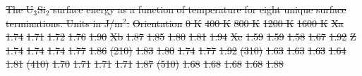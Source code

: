 \documentclass[review]{elsarticle}
\providecommand{\DIFdeltex}[1]{{\protect\color{red}\sout{#1}}}                      %
\providecommand{\DIFdelbegin}{} %
\providecommand{\DIFdelFL}[1]{\DIFdel{#1}} %
\providecommand{\DIFdel}[1]{\texorpdfstring{\DIFdeltex{#1}}{}} %
\newcommand{\DIFscaledelfig}{0.5}
\newlength{\DIFdelgraphicswidth} %
\newlength{\DIFdelgraphicsheight} %
\newcommand{\DIFdelincludegraphics}[2][]{%
\sbox{\DIFdelgraphicsbox}{\DIFOincludegraphics[#1]{#2}}%
\settoboxwidth{\DIFdelgraphicswidth}{\DIFdelgraphicsbox} %
\settoboxtotalheight{\DIFdelgraphicsheight}{\DIFdelgraphicsbox} %
\scalebox{\DIFscaledelfig}{%
\parbox[b]{\DIFdelgraphicswidth}{\usebox{\DIFdelgraphicsbox}\\[-\baselineskip] \rule{\DIFdelgraphicswidth}{0em}}\llap{\resizebox{\DIFdelgraphicswidth}{\DIFdelgraphicsheight}{%
\setlength{\unitlength}{\DIFdelgraphicswidth}%
\begin{picture}(1,1)%
\thicklines\linethickness{2pt} %
{\color[rgb]{1,0,0}\put(0,0){\framebox(1,1){}}}%
{\color[rgb]{1,0,0}\put(0,0){\line( 1,1){1}}}%
{\color[rgb]{1,0,0}\put(0,1){\line(1,-1){1}}}%
\end{picture}%
}\hspace*{3pt}}} %
} %
\DeclareRobustCommand{\DIFdelbegin}{\DIFOdelbegin \let\includegraphics\DIFdelincludegraphics} %
\begin{document}
\DIFdelbegin %
{%
\DIFdelFL{The U$_{3}$Si$_{2}$ surface energy as a function of temperature for eight unique surface terminations. Units in J/m$^{2}$.}} %
\DIFdelFL{Orientation }%
\DIFdelFL{0 K }%
\DIFdelFL{400 K }%
\DIFdelFL{800 K }%
\DIFdelFL{1200 K }%
\DIFdelFL{1600 K}%
\DIFdelFL{Xa }%
\DIFdelFL{1.74	 }%
\DIFdelFL{1.71 }%
\DIFdelFL{1.72 }%
\DIFdelFL{1.76 }%
\DIFdelFL{1.90 }%
\DIFdelFL{Xb }%
\DIFdelFL{1.87 }%
\DIFdelFL{1.85 }%
\DIFdelFL{1.80 }%
\DIFdelFL{1.81 }%
\DIFdelFL{1.94 }%
\DIFdelFL{Xc }%
\DIFdelFL{1.59	 }%
\DIFdelFL{1.59 }%
\DIFdelFL{1.58 }%
\DIFdelFL{1.67 }%
\DIFdelFL{1.92 }%
\DIFdelFL{Z }%
\DIFdelFL{1.74 }%
\DIFdelFL{1.74 }%
\DIFdelFL{1.74 }%
\DIFdelFL{1.77 }%
\DIFdelFL{1.86 }%
\DIFdelFL{(210) }%
\DIFdelFL{1.83 }%
\DIFdelFL{1.80 }%
\DIFdelFL{1.74 }%
\DIFdelFL{1.77 }%
\DIFdelFL{1.92 }%
\DIFdelFL{(310) }%
\DIFdelFL{1.63 }%
\DIFdelFL{1.63 }%
\DIFdelFL{1.63 }%
\DIFdelFL{1.64 }%
\DIFdelFL{1.81 }%
\DIFdelFL{(410) }%
\DIFdelFL{1.70 }%
\DIFdelFL{1.71 }%
\DIFdelFL{1.71 }%
\DIFdelFL{1.71 }%
\DIFdelFL{1.87 }%
\DIFdelFL{(510) }%
\DIFdelFL{1.68 }%
\DIFdelFL{1.68 }%
\DIFdelFL{1.68 }%
\DIFdelFL{1.68 }%
\DIFdelFL{1.88 }%
\end{document}
